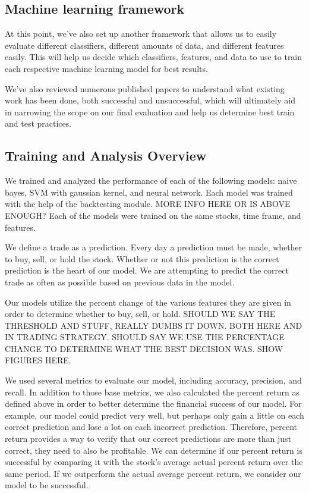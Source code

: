 \documentclass{article}
\begin{document}
\subsection{Machine learning framework}

At this point, we've also set up another framework that allows us to easily evaluate different classifiers, different amounts of data, and different features easily. This will help us decide which classifiers, features, and data to use to train each respective machine learning model for best results.

We've also reviewed numerous published papers to understand what existing work has been done, both successful and unsuccessful, which will ultimately aid in narrowing the scope on our final evaluation and help us determine best train and test practices.

\subsection{Training and Analysis Overview}
We trained and analyzed the performance of each of the following models: naive bayes, SVM with gaussian kernel, and neural network. Each model was trained with the help of the backtesting module. MORE INFO HERE OR IS ABOVE ENOUGH? Each of the models were trained on the same stocks, time frame, and features.

We define a trade as a prediction. Every day a prediction must be made, whether to buy, sell, or hold the stock. Whether or not this prediction is the correct prediction is the heart of our model. We are attempting to predict the correct trade as often as possible based on previous data in the model.

Our models utilize the percent change of the various features they are given in order to determine whether to buy, sell, or hold. SHOULD WE SAY THE THRESHOLD AND STUFF, REALLY DUMBS IT DOWN. BOTH HERE AND IN TRADING STRATEGY. SHOULD SAY WE USE THE PERCENTAGE CHANGE TO DETERMINE WHAT THE BEST DECISION WAS. SHOW FIGURES HERE.

We used several metrics to evaluate our model, including accuracy, precision, and recall. In addition to those base metrics, we also calculated the percent return as defined above in order to better determine the financial success of our model. For example, our model could predict very well, but perhaps only gain a little on each correct prediction and lose a lot on each incorrect prediction. Therefore, percent return provides a way to verify that our correct predictions are more than just correct, they need to also be profitable. We can determine if our percent return is successful by comparing it with the stock's average actual percent return over the same period. If we outperform the actual average percent return, we consider our model to be successful.
\end{document}
